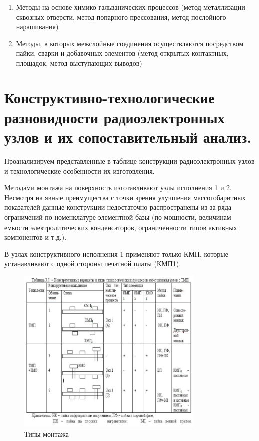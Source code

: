 \documentclass[unicode, 12pt, a4paper, oneside]{article}
\begin{document}
\begin{enumerate}
\item Методы на основе химико-гальванических процессов (метод металлизации сквозных отверсти, метод попарного прессования, метод послойного нарашивания)
\item Методы, в которых межслойные соединения осуществляются посредством пайки, сварки и добавочных элементов (метод открытых контактных, площадок, метод выступающих выводов)
\end{enumerate}


\section{Конструктивно-технологические разновидности радиоэлектронных узлов и их сопоставительный анализ.}

Проанализируем представленные в таблице конструкции радиоэлектронных узлов и технологические особенности их изготовления.

Методами монтажа на поверхность изготавливают узлы исполнения 1 и 2. Несмотря на явные преимущества с точки зрения улучшения массогобаритных показателей данные конструкции недостаточно распространены из-за ряда ограничений по номенклатуре элементной базы (по мощности, величинам емкости электролитических конденсаторов, ограниченности типов активных компонентов и т.д.).

В узлах конструктивного исполнения 1 применяют только КМП, которые устанавливают с одной стороны печатной платы (КМП1).

\begin{figure}[htbp]
\centering
\includegraphics[width=0.8\textwidth]{85_types.png}
\caption{Типы монтажа}
\label{fig:85_types}
\end{figure}
\end{document}
